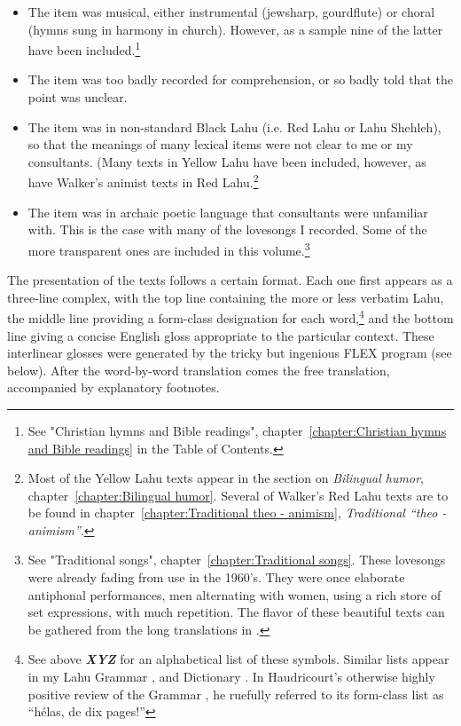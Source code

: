 \begin{itemize}
\item The item was musical, either instrumental (jewsharp, gourdflute)
  or choral (hymns sung in harmony in church). However, as a sample
  nine of the latter have been included.\footnote{See "Christian
    hymns and Bible readings", chapter~\ref{chapter:Christian hymns
      and Bible readings} in the Table of Contents.}

\item
  The item was too badly recorded for comprehension, or so badly told
  that the point was unclear.
  
\item The item was in non-standard Black Lahu (i.e. Red Lahu or Lahu
  Shehleh), so that the meanings of many lexical items were not clear
  to me or my consultants. (Many texts in Yellow Lahu have been
  included, however, as have Walker's animist texts in Red
  Lahu.\footnote{Most of the Yellow Lahu texts appear in the section
    on \emph{Bilingual humor}, chapter~\ref{chapter:Bilingual humor}. Several of Walker's Red Lahu texts
    are to be found in chapter~\ref{chapter:Traditional theo - animism}, \emph{Traditional
      ``theo - animism''}.}
  
\item
  The item was in archaic poetic language that consultants were
  unfamiliar with. This is the case with many of the lovesongs I recorded.
  Some of the more transparent ones are included in this volume.\footnote{See
    "Traditional songs", chapter~\ref{chapter:Traditional songs}. These lovesongs were already
    fading from use in the 1960's. They were once elaborate antiphonal
    performances, men alternating with women, using a rich store of set
    expressions, with much repetition. The flavor of these beautiful texts
    can be gathered from the long translations in \citet[][pp. 151-174]{y13}.}
\end{itemize}

The presentation of the texts follows a certain format. Each one first
appears as a three-line complex, with the top line containing the more
or less verbatim Lahu, the middle line providing a form-class
designation for each word,\footnote{See above \emph{\textbf{XYZ}} for
  an alphabetical list of these symbols. Similar lists appear in my
  Lahu Grammar \citep[pp. xxviii- xxxvii]{matisoff1973grammar}, and
  Dictionary \citep[pp. xxi-xxiv]{88}. In Haudricourt's otherwise
  highly positive review of the Grammar \citep{h74}, he ruefully
  referred to its form-class list as ``hélas, de dix pages!''}  and the
bottom line giving a concise English gloss appropriate to the
particular context. These interlinear glosses were generated by the
tricky but ingenious FLEX program (see below). After the word-by-word
translation comes the free translation, accompanied by explanatory
footnotes.

